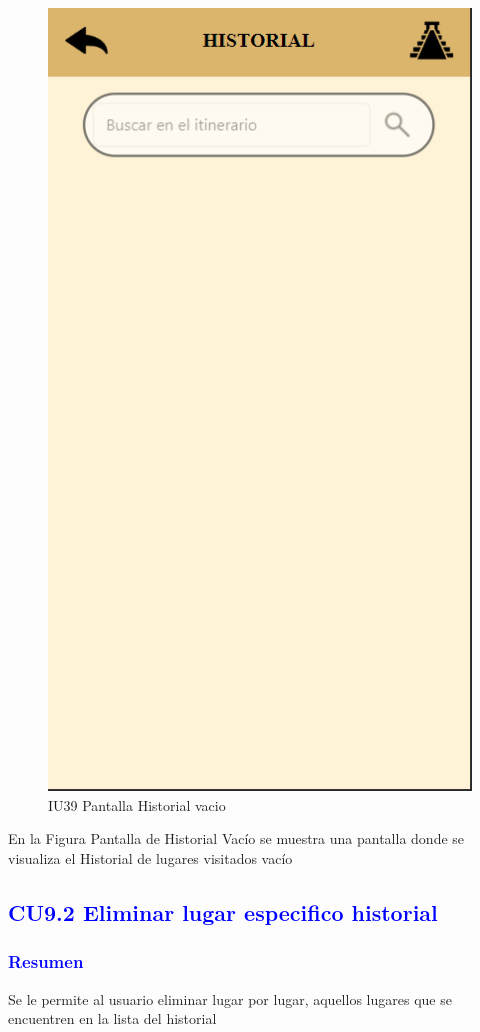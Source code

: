     \begin{figure}[htbp]
        
            \centering
            \includegraphics[width=.4\linewidth]{entregable final/pantallasSistema/IU16 Pantalla Historial.png}
    \caption{IU39 Pantalla Historial vacio}
    
    \end{figure}

En la Figura Pantalla de Historial Vacío se muestra una pantalla donde se visualiza el Historial de lugares visitados vacío


\pagebreak
\subsection{\textcolor{blue}{CU9.2 Eliminar lugar especifico historial}}
\subsubsection{\textcolor{blue}{Resumen}}
 Se le permite al usuario eliminar lugar por lugar, aquellos lugares que se encuentren en la lista del historial
